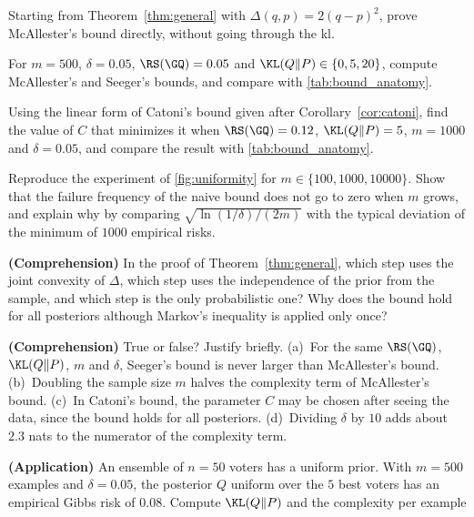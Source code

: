 \begin{exercises}
\begin{exercise}
Starting from Theorem~\ref{thm:general} with $\Delta(q,p)=2(q-p)^2$, prove McAllester's
bound directly, without going through the kl.
\end{exercise}
\begin{exercise}
For $m=500$, $\delta=0.05$, $\RS(\GQ)=0.05$ and $\KL(Q\|P)\in\{0,5,20\}$, compute
McAllester's and Seeger's bounds, and compare with \cref{tab:bound_anatomy}.
\end{exercise}
\begin{exercise}
Using the linear form of Catoni's bound given after Corollary~\ref{cor:catoni}, find
the value of $C$ that minimizes it when $\RS(\GQ)=0.12$, $\KL(Q\|P)=5$, $m=1000$ and
$\delta=0.05$, and compare the result with \cref{tab:bound_anatomy}.
\end{exercise}
\begin{exercise}
Reproduce the experiment of \cref{fig:uniformity} for $m\in\{100,1000,10000\}$.
Show that the failure frequency of the naive bound does not go to zero when $m$ grows, and
explain why by comparing $\sqrt{\ln(1/\delta)/(2m)}$ with the typical deviation of the
minimum of $1000$ empirical risks.
\end{exercise}
\begin{exercise}
\textbf{(Comprehension)} In the proof of Theorem~\ref{thm:general}, which step uses the
joint convexity of $\Delta$, which step uses the independence of the prior from the
sample, and which step is the only probabilistic one? Why does the bound hold for all
posteriors although Markov's inequality is applied only once?
\end{exercise}
\begin{exercise}
\textbf{(Comprehension)} True or false? Justify briefly. (a)~For the same
$\RS(\GQ)$, $\KL(Q\|P)$, $m$ and $\delta$, Seeger's bound is never larger than
McAllester's bound. (b)~Doubling the sample size $m$ halves the complexity term of
McAllester's bound. (c)~In Catoni's bound, the parameter $C$ may be chosen after
seeing the data, since the bound holds for all posteriors. (d)~Dividing $\delta$ by
$10$ adds about $2.3$ nats to the numerator of the complexity term.
\end{exercise}
\begin{exercise}
\textbf{(Application)} An ensemble of $n=50$ voters has a uniform prior. With $m=500$
examples and $\delta=0.05$, the posterior $Q$ uniform over the $5$ best voters has an
empirical Gibbs risk of $0.08$. Compute $\KL(Q\|P)$ and the complexity per example

\end{exercise}
\end{exercises}
